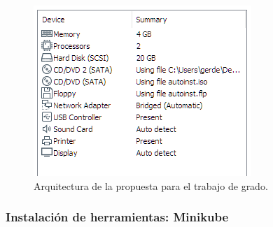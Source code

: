\begin{figure}[htpb!]
	\centering
	\includegraphics[width=0.70\columnwidth]{images/vm01.PNG}
	\caption{Arquitectura de la propuesta para el trabajo de grado.}
	\label{fig:vm01}
\end{figure}

\subsubsection{Instalación de herramientas: Minikube}

